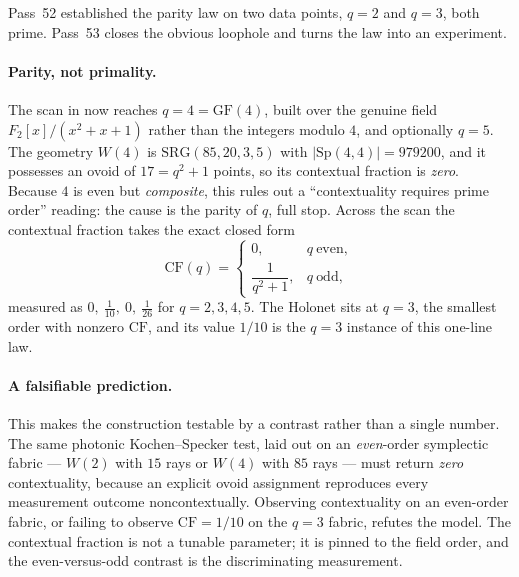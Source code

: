 \documentclass[11pt]{article}
\begin{document}
Pass~52 established the parity law on two data points, \(q=2\) and \(q=3\), both
prime.  Pass~53 closes the obvious loophole and turns the law into an experiment.

\paragraph{Parity, not primality.}  The scan in
 now reaches \(q=4=\mathrm{GF}(4)\), built over
the genuine field \(F_2[x]/(x^2+x+1)\) rather than the integers modulo \(4\), and
optionally \(q=5\).  The geometry \(W(4)\) is \(\mathrm{SRG}(85,20,3,5)\) with
\(|\mathrm{Sp}(4,4)|=979200\), and it possesses an ovoid of \(17=q^2+1\) points,
so its contextual fraction is \emph{zero}.  Because \(4\) is even but
\emph{composite}, this rules out a ``contextuality requires prime order'' reading:
the cause is the parity of \(q\), full stop.  Across the scan the contextual
fraction takes the exact closed form
\[
  \mathrm{CF}(q)=
  \begin{cases}
    0, & q\ \text{even},\\[2pt]
    \dfrac{1}{q^2+1}, & q\ \text{odd},
  \end{cases}
\]
measured as \(0,\ \tfrac1{10},\ 0,\ \tfrac1{26}\) for \(q=2,3,4,5\).  The Holonet
sits at \(q=3\), the smallest order with nonzero \(\mathrm{CF}\), and its value
\(1/10\) is the \(q=3\) instance of this one-line law.

\paragraph{A falsifiable prediction.}  This makes the construction testable by a
contrast rather than a single number.  The same photonic Kochen--Specker test,
laid out on an \emph{even}-order symplectic fabric --- \(W(2)\) with \(15\) rays
or \(W(4)\) with \(85\) rays --- must return \emph{zero} contextuality, because an
explicit ovoid assignment reproduces every measurement outcome
noncontextually.  Observing contextuality on an even-order fabric, or failing to
observe \(\mathrm{CF}=1/10\) on the \(q=3\) fabric, refutes the model.  The
contextual fraction is not a tunable parameter; it is pinned to the field order,
and the even-versus-odd contrast is the discriminating measurement.
\end{document}
